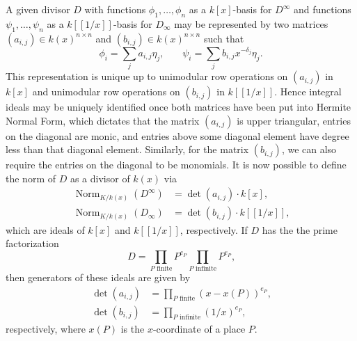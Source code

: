 \documentclass[12pt,reqno]{amsart}
\numberwithin{equation}{section}
\begin{document}
A given divisor $D$ with functions $\phi_1,\dots,\phi_n$ as a $k[x]$-basis for $D^{\infty}$ and functions $\psi_1,\dots,\psi_n$ as a $k[[1/x]]$-basis for $D_{\infty}$ may be represented by two matrices $(a_{i,j}) \in k(x)^{n \times n}$ and $(b_{i,j}) \in k(x)^{n \times n}$ such that
\begin{equation*}
 \phi_i = \sum_{j} a_{i,j} \eta_j\text{,} \quad \quad 
 \psi_i = \sum_{j} b_{i,j} x^{-\delta_j}\eta_j\text{.}
\end{equation*}
This representation is unique up to unimodular row operations on $(a_{i,j})$ in $k[x]$ and unimodular row operations on $(b_{i,j})$ in $k[[1/x]]$. Hence integral ideals may be uniquely identified once both matrices have been put into Hermite Normal Form, which dictates that the matrix $(a_{i,j})$ is upper triangular, entries on the diagonal are monic, and entries above some diagonal element have degree less than that diagonal element. Similarly, for the matrix $(b_{i,j})$, we can also require the entries on the diagonal to be monomials. It is now possible to define the norm of $D$ as a divisor of $k(x)$ via
\begin{align*}
 \operatorname{Norm}_{K/k(x)}(D^{\infty}) &= \det (a_{i,j}) \cdot k[x]\text{,}\\
 \operatorname{Norm}_{K/k(x)}(D_{\infty}) &= \det (b_{i,j}) \cdot k[[1/x]]\text{,}
\end{align*}
which are ideals of $k[x]$ and $k[[1/x]]$, respectively. If $D$ has the the prime factorization
\begin{equation*}
 D = \prod_{P \text{ finite}} P^{e_P} \prod_{P \text{ infinite}} P^{e_P}\text{,}
\end{equation*}
then generators of these ideals are given by
\begin{align*}
 \det (a_{i,j})&=\prod_{P \text{ finite}} (x-x(P))^{e_P} \text{,}\\
 \det (b_{i,j})&=\prod_{P \text{ infinite}} (1/x)^{e_P}\text{,}
\end{align*}
respectively, where $x(P)$ is the $x$-coordinate of a place $P$.
\end{document}
